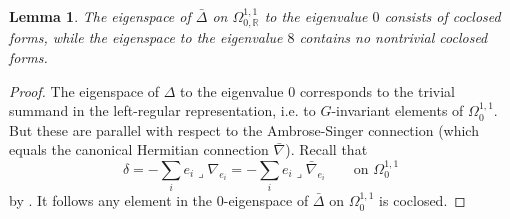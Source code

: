 \documentclass[12pt]{scrartcl}
\theoremstyle{plain}
\newtheorem{lem}[satz]{Lemma}
\theoremstyle{definition}
\newcommand{\R}{\mathbb{R}}%
\begin{document}
\begin{lem}\label{cp3coclosed}
 The eigenspace of $\bar\Delta$ on $\Omega^{1,1}_{0,\R}$ to the eigenvalue $0$ consists of coclosed forms, while the eigenspace to the eigenvalue $8$ contains no nontrivial coclosed forms.
\end{lem}
\begin{proof}
The eigenspace of $\Delta$ to the eigenvalue $0$ corresponds to the trivial summand in the left-regular representation, i.e. to $G$-invariant elements of $\Omega^{1,1}_0$. But these are parallel with respect to the Ambrose-Singer connection (which equals the canonical Hermitian connection $\bar\nabla$). Recall that
\[\delta=-\sum_ie_i\lrcorner\nabla_{e_i}=-\sum_ie_i\lrcorner\bar\nabla_{e_i}\qquad\text{on }\Omega^{1,1}_0\]
 by \cite[Lem.~4.2]{nearlykaehler}. It follows any element in the $0$-eigenspace of $\bar\Delta$ on $\Omega^{1,1}_0$ is coclosed.


\end{proof}
\end{document}
